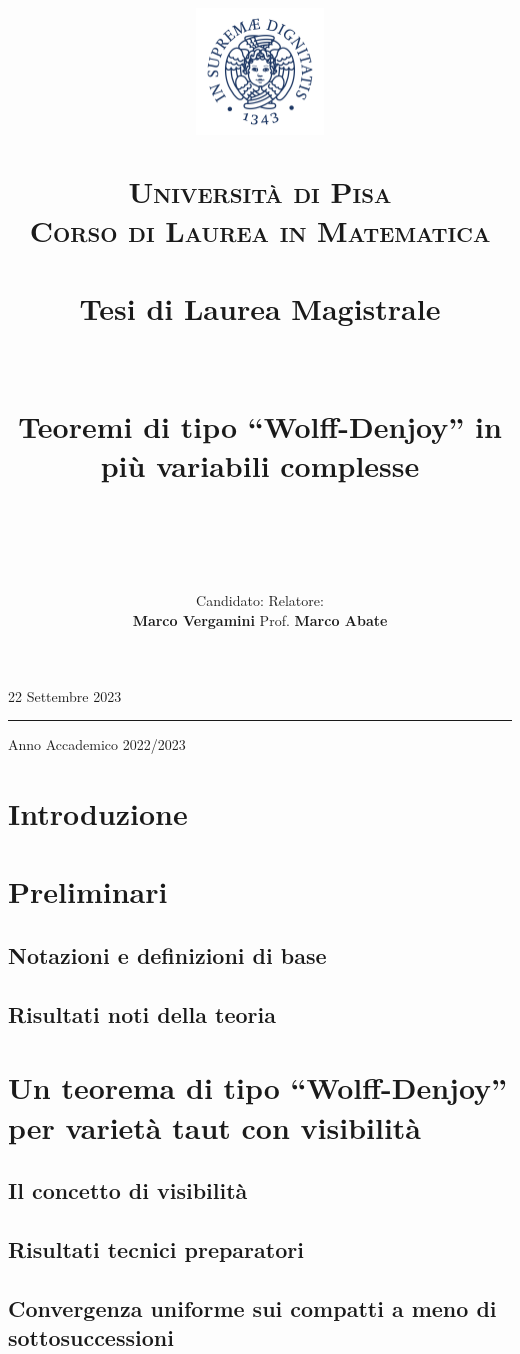 \documentclass{article}
\title{\begin{figure}[t!]
    \centering
    \includegraphics[trim=0 55 0 60, clip, width=0.3\textwidth]{Stemma_unipi.jpg}
  \end{figure}
  \vspace{-17.5mm}
  \textsc{\Large Università di Pisa}\\
  \textsc{\large Corso di Laurea in Matematica}\\
  \,\\
  {\large Tesi di Laurea Magistrale}\\
  \,\\
  \,\\
  Teoremi di tipo ``Wolff-Denjoy'' in più variabili complesse\\
  \,\\
  \,}
\author{Candidato:  \hspace{215px} Relatore:\\
  \textbf{Marco Vergamini} \hfill Prof. \textbf{Marco Abate}}
\date{}
\begin{document}
  \maketitle
  \vspace*{\fill}
  \begin{center}
    22 Settembre 2023
    \par\noindent\rule{\textwidth}{0.5pt}
    \Large Anno Accademico 2022/2023
  \end{center}
  \thispagestyle{empty}
  \newpage
  \tableofcontents
  \newpage


\section*{Introduzione}


\newpage

\section{Preliminari} \label{Preliminari}
\subsection{Notazioni e definizioni di base}

\subsection{Risultati noti della teoria} \label{risnoti}


\newpage

\section{Un teorema di tipo ``Wolff-Denjoy'' per varietà taut con visibilità} \label{Un teorema di tipo ``Wolff-Denjoy'' per varietà taut con visibilità}
\subsection{Il concetto di visibilità}

\subsection{Risultati tecnici preparatori}

\subsection{Convergenza uniforme sui compatti a meno di sottosuccessioni}\label{convcpt}

\end{document}
